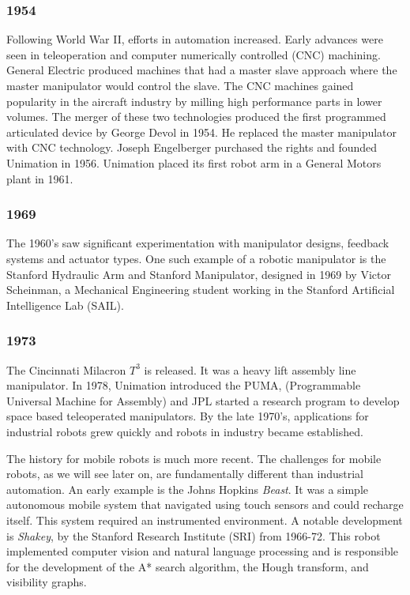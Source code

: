 \hypertarget{section-2}{%
\subsubsection{1954}\label{section-2}}

Following World War II, efforts in automation increased. Early advances
were seen in teleoperation and computer numerically controlled (CNC)
machining. General Electric produced machines that had a master slave
approach where the master manipulator would control the slave. The CNC
machines gained popularity in the aircraft industry by milling high
performance parts in lower volumes. The merger of these two technologies
produced the first programmed articulated device by George Devol in
1954. He replaced the master manipulator with CNC technology. Joseph
Engelberger purchased the rights and founded Unimation in 1956.
Unimation placed its first robot arm in a General Motors plant in 1961.

\hypertarget{section-3}{%
\subsubsection{1969}\label{section-3}}

The 1960's saw significant experimentation with manipulator designs,
feedback systems and actuator types. One such example of a robotic
manipulator is the Stanford Hydraulic Arm and Stanford Manipulator,
designed in 1969 by Victor Scheinman, a Mechanical Engineering student
working in the Stanford Artificial Intelligence Lab (SAIL).

\hypertarget{section-4}{%
\subsubsection{1973}\label{section-4}}

The Cincinnati Milacron \(T^3\) is released. It was a heavy lift
assembly line manipulator. In 1978, Unimation introduced the PUMA,
(Programmable Universal Machine for Assembly) and JPL started a research
program to develop space based teleoperated manipulators. By the late
1970's, applications for industrial robots grew quickly and robots in
industry became established.

The history for mobile robots is much more recent. The challenges for
mobile robots, as we will see later on, are fundamentally different than
industrial automation. An early example is the Johns Hopkins
\emph{Beast}. It was a simple autonomous mobile system that navigated
using touch sensors and could recharge itself. This system required an
instrumented environment. A notable development is \emph{Shakey}, by the
Stanford Research Institute (SRI) from 1966-72. This robot implemented
computer vision and natural language processing and is responsible for
the development of the A* search algorithm, the Hough transform, and
visibility graphs.
